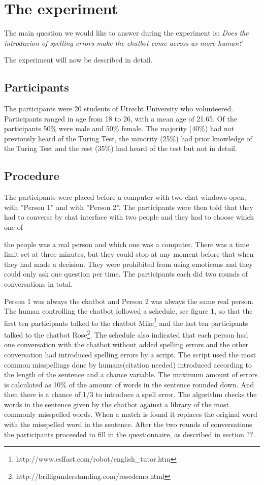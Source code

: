 \section{The experiment}
The main question we would like to answer during the experiment is:
\textit{Does the introducion of spelling errors make the chatbot come across as more human?}

The experiment will now be described in detail.


\subsection{Participants}
The participants were 20 students of Utrecht University who volunteered. Participants ranged in age from 18 to 26, with a mean age of 21.65. Of the participants 50\% were male and 50\% female. The majority (40\%) had not previously heard of the Turing Test, the minority (25\%) had prior knowledge of the Turing Test and the rest (35\%) had heard of the test but not in detail.


\subsection{Procedure}
The participants were placed before a computer with two chat windows open, with ”Person 1” and with ”Person 2”. The participants were then told that they had to converse by chat interface with two people and they had to choose which one of

the people was a real person and which one was a computer. There was a time limit set at three minutes, but they could stop at any moment before that when they had made a decision. They were prohibited from using emoticons and they could only ask one question per time. The participants each did two rounds of conversations in total.

Person 1 was always the chatbot and Person 2 was always the same real person. The human controlling the chatbot followed a schedule, see figure 1, so that the first ten participants talked to the chatbot Mike\footnote{http://www.eslfast.com/robot/english\_tutor.htm} and the last ten participants talked to the chatbot Rose\footnote{http://brilligunderstanding.com/rosedemo.html}. The schedule also indicated that each person had one conversation with the chatbot without added spelling errors and the other conversation had introduced spelling errors by a script. The script used the most common misspellings done by humans(citation needed) introduced according to the length of the sentence and a chance variable. The maximum amount of errors is calculated as 10\% of the amount of words in the sentence rounded down. And then there is a chance of 1/3 to introduce a spell error. The algorithm checks the words in the sentence given by the chatbot against a library of the most commonly misspelled words. When a match is found it replaces the original word with the misspelled word in the sentence. After the two rounds of conversations the participants proceeded to fill in the questionnaire, as described in section ??.


